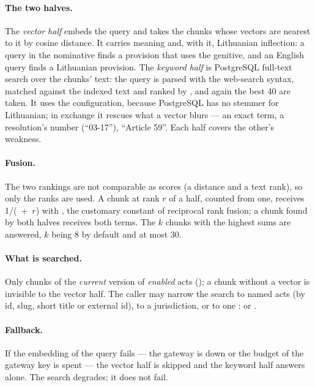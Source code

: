 \paragraph{The two halves.} The \emph{vector half} embeds the query and takes the
 chunks whose vectors are nearest to it by cosine distance. It carries
meaning and, with it, Lithuanian inflection: a query in the nominative finds a provision
that uses the genitive, and an English query finds a Lithuanian provision. The
\emph{keyword half} is PostgreSQL full-text search over the chunks' text: the query is parsed
with the web-search syntax, matched against the indexed text and ranked by ,
and again the best 40 are taken. It uses the  configuration, because PostgreSQL
has no stemmer for Lithuanian; in exchange it rescues what a vector blurs --- an exact term, a
resolution's number (\enquote{03-17}), \enquote{Article 59}. Each half covers the other's
weakness.

\paragraph{Fusion.} The two rankings are not comparable as scores (a distance and a text
rank), so only the ranks are used. A chunk at rank $r$ of a half, counted from one, receives
1/(~+~$r$) with , the customary constant of reciprocal rank
fusion; a chunk found by both halves receives both terms. The $k$ chunks with the highest
sums are answered, $k$ being 8 by default and at most 30.

\paragraph{What is searched.} Only chunks of the \emph{current} version of \emph{enabled}
acts (); a chunk without a vector is invisible to the vector half. The
caller may narrow the search to named acts (by id, slug, short title or external id), to a
jurisdiction, or to one :  or .

\paragraph{Fallback.} If the embedding of the query fails --- the gateway is down or the
budget of the gateway key is spent --- the vector half is skipped and the keyword half answers
alone. The search degrades; it does not fail.

